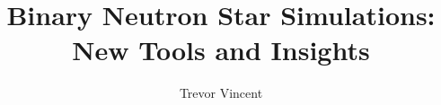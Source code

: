 

 
 \author{Trevor Vincent}
\title{Binary Neutron Star Simulations: New Tools and Insights}



%
\setcounter{tocdepth}{2}






